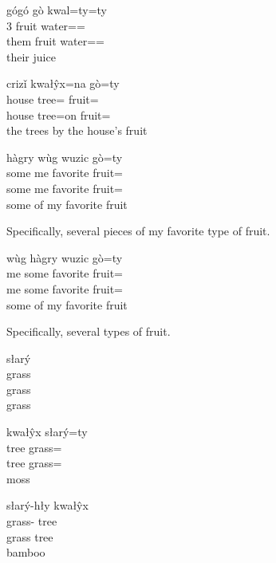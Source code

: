 \begin{exe}
    \ex
    \glll
    gógó gò kwal=ty=ty \\
    3\Pl{} fruit water=\Poss{}=\Poss{} \\
    them fruit water=\Poss{}=\Poss{} \\
    \glt
    their juice
\end{exe}

\begin{exe}
    \ex
    \glll
    crizǐ kwałŷx=na gò=ty \\
    house tree=\AdessTwo{} fruit=\Poss{} \\
    house tree=on fruit=\Poss{} \\
    \glt
    the trees by the house's fruit
\end{exe}

\begin{exe}
    \ex
    \glll
    hàgry wùg wuzic gò=ty \\
    some me favorite fruit=\Poss{} \\
    some me favorite fruit=\Poss{} \\
    \glt
    some of my favorite fruit
\end{exe}
Specifically, several pieces of my favorite type of fruit.

\begin{exe}
    \ex
    \glll
    wùg hàgry wuzic gò=ty \\
    me some favorite fruit=\Poss{} \\
    me some favorite fruit=\Poss{} \\
    \glt
    some of my favorite fruit
\end{exe}
Specifically, several types of fruit.

\begin{exe}
    \ex
    \glll
    słarý \\
    grass \\
    grass \\
    \glt
    grass
\end{exe}

\begin{exe}
    \ex
    \glll
    kwałŷx słarý=ty \\
    tree grass=\Poss{} \\
    tree grass=\Poss{} \\
    \glt
    moss
\end{exe}

\begin{exe}
    \ex
    \glll
    słarý-hły kwałŷx \\
    grass-\Adj{} tree \\
    grass tree \\
    \glt
    bamboo
\end{exe}

